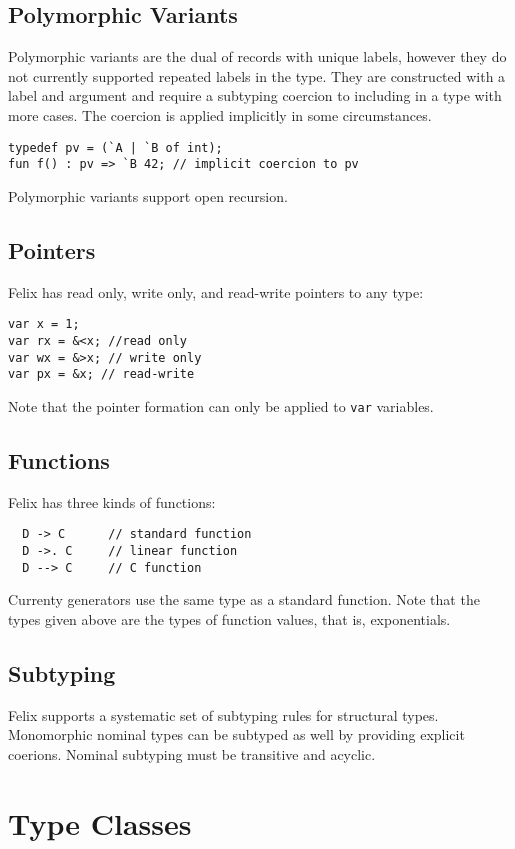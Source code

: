 \documentclass[oneside]{book}
\begin{document}
\subsection{Polymorphic Variants}
Polymorphic variants are the dual of records with unique labels,
however they do not currently supported repeated labels in the type.
They are constructed with a label and argument and require a subtyping
coercion to including in a type with more cases. The coercion is applied
implicitly in some circumstances.
\begin{verbatim}
typedef pv = (`A | `B of int);
fun f() : pv => `B 42; // implicit coercion to pv
\end{verbatim}
Polymorphic variants support open recursion.

\subsection{Pointers}
Felix has read only, write only, and read-write pointers to any type:
\begin{verbatim}
var x = 1;
var rx = &<x; //read only
var wx = &>x; // write only
var px = &x; // read-write
\end{verbatim}

Note that the pointer formation can only be applied to 
\verb$var$ variables.

\subsection{Functions}
Felix has three kinds of functions:

\begin{verbatim}
  D -> C      // standard function
  D ->. C     // linear function
  D --> C     // C function
\end{verbatim}

Currenty generators use the same type as a standard function.
Note that the types given above are the types of function values,
that is, exponentials.

\subsection{Subtyping}
Felix supports a systematic set of subtyping rules for structural types.
Monomorphic nominal types can be subtyped as well by providing explicit
coerions. Nominal subtyping must be transitive and acyclic.

\section{Type Classes}
\end{document}
